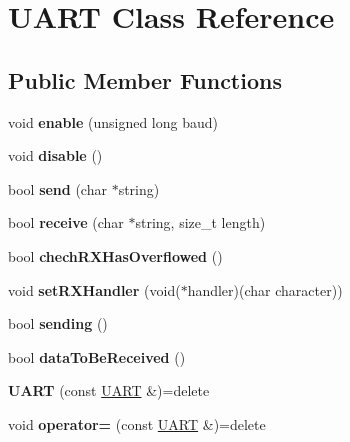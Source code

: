 \hypertarget{class_u_a_r_t}{\section{U\-A\-R\-T Class Reference}
\label{class_u_a_r_t}
}
\subsection*{Public Member Functions}
\begin{DoxyCompactItemize}
\item 
\hypertarget{class_u_a_r_t_a7eea1c86736842640876deb230c180e0}{void {\bfseries enable} (unsigned long baud)}\label{class_u_a_r_t_a7eea1c86736842640876deb230c180e0}

\item 
\hypertarget{class_u_a_r_t_a4810eb2465db123aecd7a6212ffc9ecb}{void {\bfseries disable} ()}\label{class_u_a_r_t_a4810eb2465db123aecd7a6212ffc9ecb}

\item 
\hypertarget{class_u_a_r_t_a56db0eecfdbd070cb44f74f1686037a0}{bool {\bfseries send} (char $\ast$string)}\label{class_u_a_r_t_a56db0eecfdbd070cb44f74f1686037a0}

\item 
\hypertarget{class_u_a_r_t_aa6afd5b77ad5187c920a7df6cb89c54b}{bool {\bfseries receive} (char $\ast$string, size\-\_\-t length)}\label{class_u_a_r_t_aa6afd5b77ad5187c920a7df6cb89c54b}

\item 
\hypertarget{class_u_a_r_t_a233d5e3c98ad84e55ed325132302d6b4}{bool {\bfseries chech\-R\-X\-Has\-Overflowed} ()}\label{class_u_a_r_t_a233d5e3c98ad84e55ed325132302d6b4}

\item 
\hypertarget{class_u_a_r_t_a0492180c6f45f4a08ffee166e37da417}{void {\bfseries set\-R\-X\-Handler} (void($\ast$handler)(char character))}\label{class_u_a_r_t_a0492180c6f45f4a08ffee166e37da417}

\item 
\hypertarget{class_u_a_r_t_a5a7e9ca6d3925ddf50a09a3404cc7469}{bool {\bfseries sending} ()}\label{class_u_a_r_t_a5a7e9ca6d3925ddf50a09a3404cc7469}

\item 
\hypertarget{class_u_a_r_t_a0e89069e28f56e068cd64513f568883f}{bool {\bfseries data\-To\-Be\-Received} ()}\label{class_u_a_r_t_a0e89069e28f56e068cd64513f568883f}

\item 
\hypertarget{class_u_a_r_t_a97debffc29b178c09b104f4542298a36}{{\bfseries U\-A\-R\-T} (const \hyperlink{class_u_a_r_t}{U\-A\-R\-T} \&)=delete}\label{class_u_a_r_t_a97debffc29b178c09b104f4542298a36}

\item 
\hypertarget{class_u_a_r_t_a843ab7fc20f5ce5f030d2ca5ee98d6b6}{void {\bfseries operator=} (const \hyperlink{class_u_a_r_t}{U\-A\-R\-T} \&)=delete}\label{class_u_a_r_t_a843ab7fc20f5ce5f030d2ca5ee98d6b6}

\end{DoxyCompactItemize}
